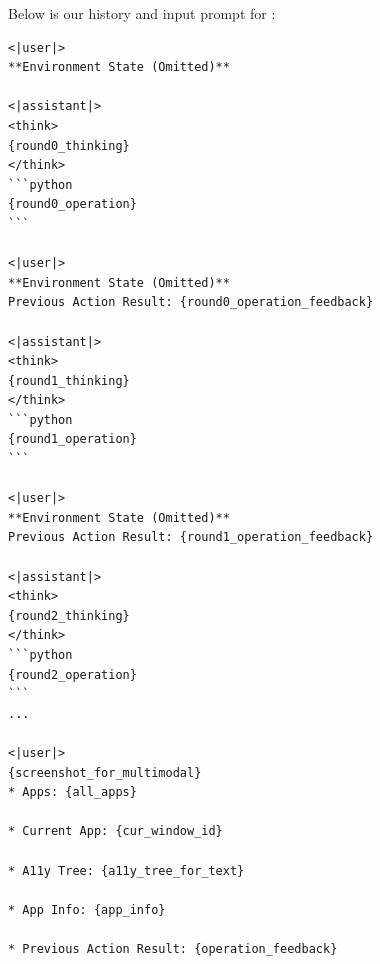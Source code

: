Below is our history and input prompt for \model:
\begin{lstlisting}
<|user|>
**Environment State (Omitted)**

<|assistant|>
<think>
{round0_thinking}
</think>
```python
{round0_operation}
```

<|user|>
**Environment State (Omitted)**
Previous Action Result: {round0_operation_feedback}

<|assistant|>
<think>
{round1_thinking}
</think>
```python
{round1_operation}
```

<|user|>
**Environment State (Omitted)**
Previous Action Result: {round1_operation_feedback}

<|assistant|>
<think>
{round2_thinking}
</think>
```python
{round2_operation}
```
...

<|user|>
{screenshot_for_multimodal}
* Apps: {all_apps}

* Current App: {cur_window_id}

* A11y Tree: {a11y_tree_for_text}

* App Info: {app_info}

* Previous Action Result: {operation_feedback}\end{lstlisting}

\newpage